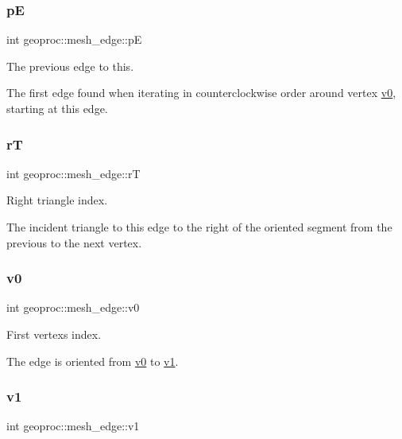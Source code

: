 \subsubsection{\texorpdfstring{pE}{pE}}
{\footnotesize\ttfamily int geoproc\+::mesh\+\_\+edge\+::pE}



The previous edge to this. 

The first edge found when iterating in counterclockwise order around vertex \hyperlink{classgeoproc_1_1mesh__edge_a1d4e25142bb7580c91fad0b74916f1ec}{v0}, starting at this edge. \mbox{\label{classgeoproc_1_1mesh__edge_af19f02d3f6c36f2b23afa581c8ae3f59}} 
\subsubsection{\texorpdfstring{rT}{rT}}
{\footnotesize\ttfamily int geoproc\+::mesh\+\_\+edge\+::rT}



Right triangle index. 

The incident triangle to this edge to the right of the oriented segment from the previous to the next vertex. \mbox{\label{classgeoproc_1_1mesh__edge_a1d4e25142bb7580c91fad0b74916f1ec}} 
\subsubsection{\texorpdfstring{v0}{v0}}
{\footnotesize\ttfamily int geoproc\+::mesh\+\_\+edge\+::v0}



First vertex\textquotesingle{}s index. 

The edge is oriented from \hyperlink{classgeoproc_1_1mesh__edge_a1d4e25142bb7580c91fad0b74916f1ec}{v0} to \hyperlink{classgeoproc_1_1mesh__edge_a841e7dc084b54f0abaa6f52b10343e8d}{v1}. \mbox{\label{classgeoproc_1_1mesh__edge_a841e7dc084b54f0abaa6f52b10343e8d}} 
\subsubsection{\texorpdfstring{v1}{v1}}
{\footnotesize\ttfamily int geoproc\+::mesh\+\_\+edge\+::v1}



